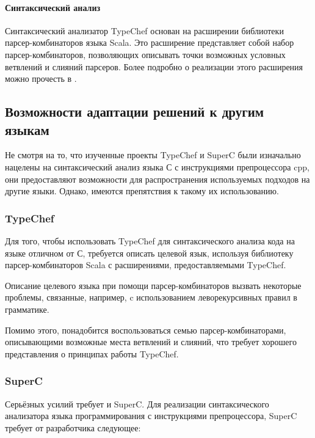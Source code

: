 \paragraph{Синтаксический анализ}

Синтаксический анализатор TypeChef основан на расширении библиотеки парсер-комбинаторов языка Scala. Это расширение представляет собой набор парсер-комбинаторов, позволяющих описывать точки возможных условных ветвлений и слияний парсеров. Более подробно о реализации этого расширения можно прочесть в \cite{typechef2}.


\subsection{Возможности адаптации решений к другим языкам}

Не смотря на то, что изученные проекты TypeChef и SuperC были изначально нацелены на синтаксический анализ языка С с инструкциями препроцессора cpp, они предоставляют возможности для распространения используемых подходов на другие языки. Однако, имеются препятствия к такому их использованию.

\subsubsection{TypeChef}

Для того, чтобы использовать TypeChef для синтаксического анализа кода на языке отличном от С, требуется описать целевой язык, используя библиотеку парсер-комбинаторов Scala с расширениями, предоставляемыми TypeChef.

Описание целевого языка при помощи парсер-комбинаторов вызвать некоторые проблемы, связанные, например, c использованием леворекурсивных правил в грамматике. 

Помимо этого, понадобится воспользоваться семью парсер-комбинаторами, описывающими возможные места ветвлений и слияний, что требует хорошего представления о принципах работы TypeChef.

\subsubsection{SuperC}

Серьёзных усилий требует и SuperC. Для реализации синтаксического анализатора языка программирования с инструкциями препроцессора, SuperC требует от разработчика следующее:

